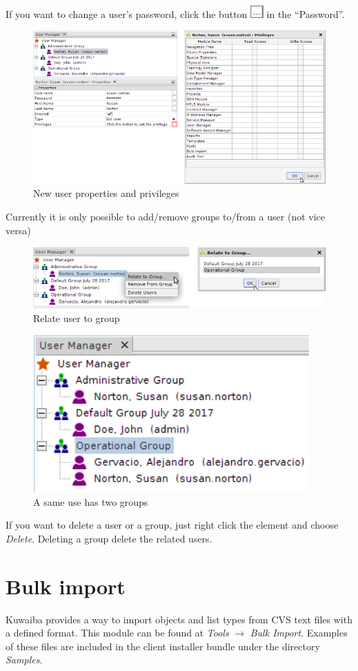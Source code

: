 \documentclass[a4paper]{article}
\begin{document}
		If you want to change a user's password, click the button \includegraphics[width=0.5cm]{img/icon_edit_user.png} in the “Password”.
		\begin{figure}[h!]
			\centering
			\includegraphics[width=0.7\linewidth]{img/user_manager_user_properties_privileges.png}
			\caption{New user properties and privileges}
			\label{fig:user_manager_user_properties_privileges}
		\end{figure}
		Currently it is only possible to add/remove groups to/from a user (not vice versa)
		\begin{figure}[h!]
			\centering
			\includegraphics[width=0.5\linewidth]{img/user_manager_relate_to_group.png}
			\caption{Relate user to group}
			\label{fig:user_manager_relate_to_group}
		\end{figure}
		\begin{figure}[h!]
			\centering
			\includegraphics[width=0.4\linewidth]{img/user_manager_user_and_groups.png}
			\caption{A same use has two groups}
			\label{fig:user_manager_user_and_groups}
		\end{figure}
		If you want to delete a user or a group, just right click the element and choose \textit{Delete}. Deleting a group delete the related users.
						
		\clearpage
		\section{Bulk import}\label{sec:bulk_import}
			Kuwaiba  provides a  way  to  import  objects  and  list  types  from CVS text files with a defined format.  This  module  can be  found at \textit{Tools} $\rightarrow$ \textit{Bulk Import}. Examples of these files are included in the client installer bundle under the directory \textit{Samples}.
\end{document}
